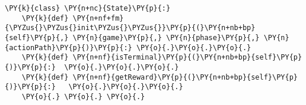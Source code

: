 \begin{Verbatim}[commandchars=\\\{\}]
\PY{k}{class} \PY{n+nc}{State}\PY{p}{:}
    \PY{k}{def} \PY{n+nf+fm}{\PYZus{}\PYZus{}init\PYZus{}\PYZus{}}\PY{p}{(}\PY{n+nb+bp}{self}\PY{p}{,} \PY{n}{game}\PY{p}{,} \PY{n}{phase}\PY{p}{,} \PY{n}{actionPath}\PY{p}{)}\PY{p}{:} \PY{o}{.}\PY{o}{.}\PY{o}{.}
    \PY{k}{def} \PY{n+nf}{isTerminal}\PY{p}{(}\PY{n+nb+bp}{self}\PY{p}{)}\PY{p}{:}  \PY{o}{.}\PY{o}{.}\PY{o}{.}
    \PY{k}{def} \PY{n+nf}{getReward}\PY{p}{(}\PY{n+nb+bp}{self}\PY{p}{)}\PY{p}{:}   \PY{o}{.}\PY{o}{.}\PY{o}{.}
    \PY{o}{.} \PY{o}{.} \PY{o}{.}
\end{Verbatim}
